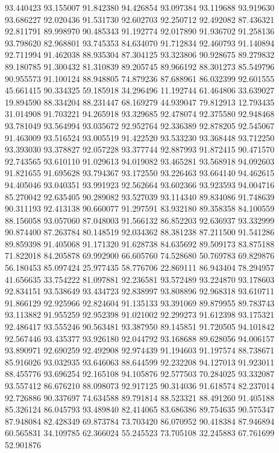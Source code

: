93.440423
93.155007
91.842380
94.426854
93.097384
93.119688
93.919630
93.686227
92.020436
91.531730
92.602703
92.250712
92.492082
87.436321
92.811791
89.998970
90.485343
91.192774
92.017890
91.936702
91.258136
93.798620
82.968801
93.745353
84.634070
91.712834
92.460793
91.140894
92.711994
91.462038
88.935304
87.304125
93.323806
90.928675
89.279832
89.180785
91.300432
81.310839
89.205745
89.966192
88.301273
85.549796
90.955573
91.100124
88.948805
74.879236
87.688961
86.032399
92.601555
45.661415
90.334325
59.185918
34.296496
11.192744
61.464806
33.639027
19.894590
88.334204
88.231447
68.169279
44.939047
79.812913
12.793435
31.014908
91.703221
94.265918
93.329685
92.478074
92.375580
92.948468
93.781049
93.564994
93.035672
92.952764
92.336389
92.878205
92.545067
91.463009
93.516524
93.005519
91.422520
93.533230
93.368448
93.712250
93.393030
93.378827
92.057228
93.377744
92.887993
91.872415
90.471570
92.743565
93.610110
91.029613
94.019082
93.465281
93.568918
94.092603
91.821655
91.695628
93.794367
93.172550
93.226463
93.664140
94.462615
94.405046
93.040351
93.991923
92.562664
93.602366
93.923593
94.004716
85.270042
92.635405
90.289082
93.527039
93.114340
89.834086
91.748639
90.311193
92.413138
90.660077
91.297591
83.932180
89.358358
84.100559
88.156058
93.057060
87.048003
91.566132
86.852203
92.636937
93.332999
90.874400
87.263784
80.148519
92.034362
88.381238
87.211500
91.541286
89.859398
91.405068
91.171320
91.628738
84.635692
89.509173
83.875188
71.822018
84.205878
69.992900
66.605760
74.528680
50.769783
69.829876
56.180453
85.097424
25.977435
58.776706
22.869111
86.943404
78.294957
41.656635
33.754222
81.097881
92.236581
93.572489
93.224870
93.178603
92.834151
93.538649
93.434723
92.838997
93.808896
92.968318
93.610711
91.866129
92.925966
92.824604
91.135133
93.391069
89.879955
89.783743
93.113882
91.955259
92.952398
91.021002
92.299273
91.612398
93.175321
92.486417
93.555246
90.563481
93.387950
89.145851
91.720505
94.101842
92.567446
93.435377
93.926180
92.044792
93.168688
89.628056
94.006157
93.890971
92.690259
92.492908
92.974439
91.194603
91.197574
88.738671
85.916026
93.032935
93.646063
88.644599
92.232208
94.127013
91.923011
88.455776
93.696254
92.165108
94.105876
92.577503
70.284025
93.332087
93.557412
86.676210
88.098073
92.917125
90.314036
91.618574
82.237014
92.726886
90.337697
74.634588
89.791814
88.523321
88.491260
91.405188
85.326124
86.045793
93.489840
82.414065
83.686386
89.754635
90.575347
87.948084
82.428349
69.873784
73.703420
86.070952
90.418384
87.946894
60.565831
34.109785
62.366024
55.245523
73.705108
32.245883
67.761699
52.901876
